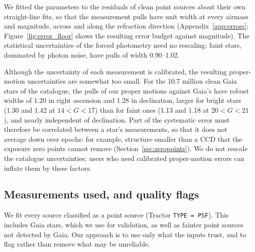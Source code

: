 \documentclass[usenatbib]{mnras}   %
\begin{document}
We fitted the parameters to the residuals of clean point sources about their own straight-line fits, so that the measurement pulls have unit width at every airmass and magnitude, across and along the refraction direction (Appendix~\ref{app:errors}; Figure~\ref{fig:error_floor} shows the resulting error budget against magnitude). The statistical uncertainties of the forced photometry need no rescaling: faint stars, dominated by photon noise, have pulls of width 0.90--1.02.

Although the uncertainty of each measurement is calibrated, the resulting proper-motion uncertainties are somewhat too small. For the 10.7 million clean Gaia stars of the catalogue, the pulls of our proper motions against Gaia's have robust widths of 1.20 in right ascension and 1.28 in declination, larger for bright stars (1.30 and 1.42 at $14 < G < 17$) than for faint ones (1.13 and 1.18 at $20 < G < 21$), and nearly independent of declination. Part of the systematic error must therefore be correlated between a star's measurements, so that it does not average down over epochs: for example, structure smaller than a CCD that the exposure zero points cannot remove (Section~\ref{sec:zeropoints}). We do not rescale the catalogue uncertainties; users who need calibrated proper-motion errors can inflate them by these factors.


\subsection{Measurements used, and quality flags} \label{sec:flags}

We fit every source classified as a point source (Tractor \texttt{TYPE = PSF}). This includes Gaia stars, which we use for validation, as well as fainter point sources not detected by Gaia. Our approach is to use only what the inputs trust, and to flag rather than remove what may be unreliable.
\end{document}
